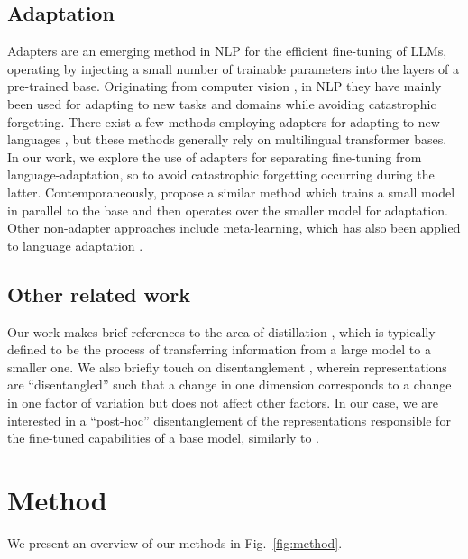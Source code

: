 \documentclass[11pt]{article}
\begin{document}
\subsection{Adaptation}

Adapters \citep{houlsby_parameter-efficient_2019} are an emerging method in NLP for the efficient
fine-tuning of LLMs, operating by injecting a small number of trainable parameters into the layers
of a pre-trained base. Originating from computer vision \citep{rebuffi_learning_2017}, in NLP they
have mainly been used for adapting to new tasks \citep{stickland_bert_2019} and domains
\citep{bapna_simple_2019} while avoiding catastrophic forgetting. There exist a few methods
employing adapters for adapting to new languages \citep{pfeiffer_mad-x_2020, ustun_hyper-x_2022},
but these methods generally rely on multilingual transformer bases. In our work, we explore the use
of adapters for separating fine-tuning from language-adaptation, so to avoid catastrophic forgetting
occurring during the latter. Contemporaneously, \citet{marchisio_mini-model_2022} propose a similar
method which trains a small model in parallel to the base and then operates over the smaller model
for adaptation. Other non-adapter approaches include meta-learning, which has also been applied to
language adaptation \citep{nooralahzadeh_zero-shot_2020}.

\subsection{Other related work}

Our work makes brief references to the area of distillation \citep{hinton_distilling_2015}, which is
typically defined to be the process of transferring information from a large model to a smaller one.
We also briefly touch on disentanglement \citep{bengio_representation_2013}, wherein representations
are ``disentangled'' such that a change in one dimension corresponds to a change in one factor of
variation but does not affect other factors. In our case, we are interested in a ``post-hoc''
disentanglement of the representations responsible for the fine-tuned capabilities of a base model,
similarly to \citet{khrulkov_disentangled_2021}.

\section{Method}\label{sec:method}

We present an overview of our methods in Fig.\@~\ref{fig:method}.
\end{document}
